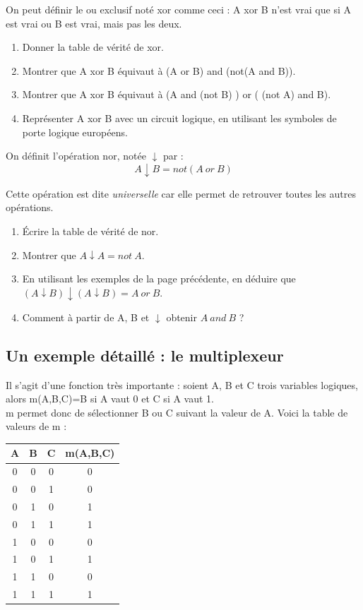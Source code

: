 \documentclass[a4paper,12pt,french]{book}
\begin{document}
\begin{exercice}[]
	On peut définir le \og ou exclusif\fg{} noté xor comme ceci :  A xor B n'est vrai que si A est vrai ou B est vrai, mais pas les deux.
	\begin{enumerate}[\bfseries 1.]
		\item 	Donner la table de vérité de xor.
		\item 	Montrer que A xor B équivaut à (A or B) and (not(A and B)).
		\item 	Montrer que A xor B équivaut à (A and (not B) ) or ( (not A) and B).
		\item 	Représenter A xor B avec un circuit logique, en utilisant les symboles de porte logique européens.
	\end{enumerate}
\end{exercice}

\begin{exercice}[]
	On définit l'opération \og nor\fg{}, notée $\downarrow$ par : $$A\downarrow B = not(A\ or\ B)$$
	
	Cette opération est dite \textit{universelle} car elle permet de retrouver toutes les autres opérations.
	
	\begin{enumerate}[\bfseries 1.]
		\item 	\'Ecrire la table de vérité de nor.
		\item 	Montrer que $A\downarrow A = not\ A$.
		\item 	En utilisant les exemples de la page précédente, en déduire que $(A\downarrow B)\downarrow(A\downarrow B) = A\ or\ B$.
		\item 	Comment à partir de A, B et $\downarrow$ obtenir $A\ and\ B$ ?
	\end{enumerate}
\end{exercice}

\subsection{Un exemple détaillé : le multiplexeur}

Il s'agit d'une fonction très importante : soient A, B et C trois variables logiques, alors m(A,B,C)=B si A vaut 0 et C si A vaut 1.\\ m permet 
donc de sélectionner B ou C suivant la valeur de A. Voici la table de valeurs de m :
\begin{center}
	\begin{tabular}{|c|c|c|c|}
		\hline
		A & B & C & m(A,B,C) \\
		\hline
		0 & 0 & 0 & 0        \\
		\hline
		0 & 0 & 1 & 0        \\
		\hline
		0 & 1 & 0 & 1        \\
		\hline
		0 & 1 & 1 & 1        \\
		\hline
		1 & 0 & 0 & 0        \\
		\hline
		1 & 0 & 1 & 1        \\
		\hline
		1 & 1 & 0 & 0        \\
		\hline
		1 & 1 & 1 & 1        \\
		\hline
	\end{tabular}
\end{center}
\end{document}
